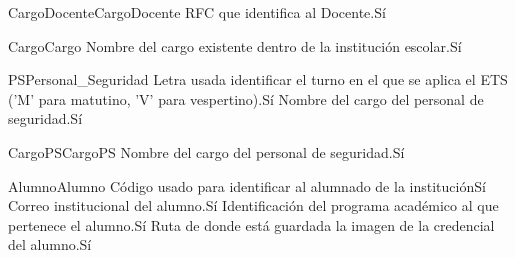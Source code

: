 \begin{cdtEntidad}{CargoDocente}{CargoDocente}
	{RFC que identifica al Docente.}{Sí}
\end{cdtEntidad}
\begin{cdtEntidad}{Cargo}{Cargo}
	{Nombre del cargo existente dentro de la institución escolar.}{Sí}
\end{cdtEntidad}
\begin{cdtEntidad}{PS}{Personal\_Seguridad}
	{Letra usada identificar el turno en el que se aplica el ETS ('M' para matutino, 'V' para vespertino).}{Sí}
	{Nombre del cargo del personal de seguridad.}{Sí}
	\cdtEntityRelSection
\end{cdtEntidad}
\begin{cdtEntidad}{CargoPS}{CargoPS}
	{Nombre del cargo del personal de seguridad.}{Sí}
\end{cdtEntidad}
\begin{cdtEntidad}{Alumno}{Alumno}
	{Código usado para identificar al alumnado de la institución}{Sí}
	{Correo institucional del alumno.}{Sí}
	{Identificación del programa académico al que pertenece el alumno.}{Sí}
	{Ruta de donde está guardada la imagen de la credencial del alumno.}{Sí}
\end{cdtEntidad}
